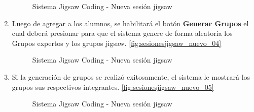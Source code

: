 \begin{enumerate}
\begin{figure}
	\centering
	\caption{Sistema Jigsaw Coding - Nueva sesión jigsaw}
	\label{fig:sesionesjigsaw_nuevo_03}
	\end{figure}
	\item Luego de agregar a los alumnos, se habilitará el botón \textbf{Generar Grupos} el cual deberá presionar para que el sistema genere de forma aleatoria los Grupos expertos y los grupos jigsaw. \autoref{fig:sesionesjigsaw_nuevo_04}
	\begin{figure}
		\centering
		\caption{Sistema Jigsaw Coding - Nueva sesión jigsaw}
		\label{fig:sesionesjigsaw_nuevo_04}
	\end{figure}
	\item Si la generación de grupos se realizó exitosamente, el sistema le mostrará los grupos sus respectivos integrantes. \autoref{fig:sesionesjigsaw_nuevo_05}
	\begin{figure}
		\centering
		\caption{Sistema Jigsaw Coding - Nueva sesión jigsaw}
		\label{fig:sesionesjigsaw_nuevo_05}

\end{figure}
\end{enumerate}
